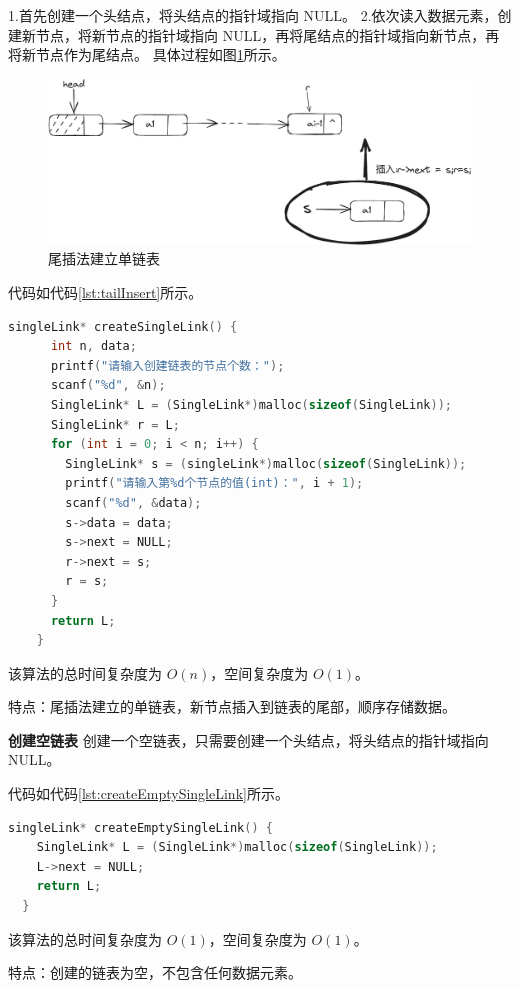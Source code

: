 \documentclass[lang=cn,newtx,10pt,scheme=chinese]{../elegantbook}
\begin{document}
  1.首先创建一个头结点，将头结点的指针域指向 NULL。
  2.依次读入数据元素，创建新节点，将新节点的指针域指向 NULL，再将尾结点的指针域指向新节点，再将新节点作为尾结点。
  具体过程如图\ref{fig:tailInsert}所示。
  \begin{figure}[h]
    \centering
    \includegraphics[width=1\textwidth]{./figure/pdf/cropped/tailInsert.pdf}
    \caption{尾插法建立单链表}
    \label{fig:tailInsert}
  \end{figure}
  代码如代码\ref{lst:tailInsert}所示。
  \begin{lstlisting}[language=C++, caption={尾插法建立单链表示例代码}, label={lst:tailInsert}]
    singleLink* createSingleLink() {
      int n, data;
      printf("请输入创建链表的节点个数：");
      scanf("%d", &n);
      SingleLink* L = (SingleLink*)malloc(sizeof(SingleLink));
      SingleLink* r = L;
      for (int i = 0; i < n; i++) {
        SingleLink* s = (singleLink*)malloc(sizeof(SingleLink));
        printf("请输入第%d个节点的值(int)：", i + 1);
        scanf("%d", &data);
        s->data = data;
        s->next = NULL;
        r->next = s;
        r = s;
      }
      return L;
    }
    \end{lstlisting}
    该算法的总时间复杂度为 $O(n)$，空间复杂度为 $O(1)$。

    特点：尾插法建立的单链表，新节点插入到链表的尾部，顺序存储数据。

    \textbf{创建空链表}
创建一个空链表，只需要创建一个头结点，将头结点的指针域指向 NULL。

代码如代码\ref{lst:createEmptySingleLink}所示。
\begin{lstlisting}[language=C++, caption={创建一个空链表示例代码}, label={lst:createEmptySingleLink}]
  singleLink* createEmptySingleLink() {
    SingleLink* L = (SingleLink*)malloc(sizeof(SingleLink));
    L->next = NULL;
    return L;
  }
\end{lstlisting}
该算法的总时间复杂度为 $O(1)$，空间复杂度为 $O(1)$。

特点：创建的链表为空，不包含任何数据元素。
\end{document}
